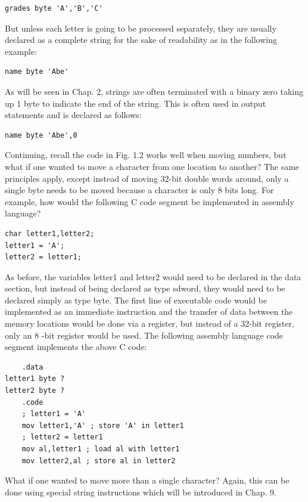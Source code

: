 \documentclass[10pt]{article}
\begin{document}
\begin{verbatim}
grades byte 'A','B','C'
\end{verbatim}

But unless each letter is going to be processed separately, they are usually declared as a complete string for the sake of readability as in the following example:

\begin{verbatim}
name byte 'Abe'
\end{verbatim}

As will be seen in Chap. 2, strings are often terminated with a binary zero taking up 1 byte to indicate the end of the string. This is often used in output statements and is declared as follows:

\begin{verbatim}
name byte 'Abe',0
\end{verbatim}

Continuing, recall the code in Fig. 1.2 works well when moving numbers, but what if one wanted to move a character from one location to another? The same principles apply, except instead of moving 32-bit double words around, only a single byte needs to be moved because a character is only 8 bits long. For example, how would the following C code segment be implemented in assembly language?

\begin{verbatim}
char letter1,letter2;
letter1 = 'A';
letter2 = letter1;
\end{verbatim}

As before, the variables letter1 and letter2 would need to be declared in the data section, but instead of being declared as type sdword, they would need to be declared simply as type byte. The first line of executable code would be implemented as an immediate instruction and the transfer of data between the memory locations would be done via a register, but instead of a 32-bit register, only an 8 -bit register would be used. The following assembly language code segment implements the above C code:

\begin{verbatim}
    .data
letter1 byte ?
letter2 byte ?
    .code
    ; letter1 = 'A'
    mov letter1,'A' ; store 'A' in letter1
    ; letter2 = letter1
    mov al,letter1 ; load al with letter1
    mov letter2,al ; store al in letter2
\end{verbatim}

What if one wanted to move more than a single character? Again, this can be done using special string instructions which will be introduced in Chap. 9.
\end{document}

